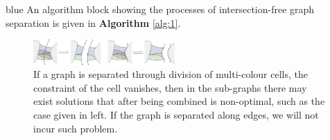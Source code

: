 \documentclass[journal]{IEEEtran}
\begin{document}
\begin{color}{blue}
An algorithm block showing the processes of intersection-free graph separation is given in \textbf{Algorithm} \ref{alg:1}. 

\begin{figure}[t]
\centering
\includegraphics[width=0.48\textwidth]{figures/separation_at_edges_2}
\caption{If a graph is separated through division of multi-colour cells, the constraint of the cell vanishes, then in the sub-graphs there may exist solutions that after being combined is non-optimal, such as the case given in left. If the graph is separated along edges, we will not incur such problem. }\label{fig:separation_at_edges}
\end{figure}





\end{color}
\end{document}
